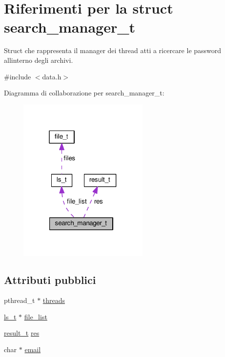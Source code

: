 \hypertarget{structsearch__manager__t}{}\section{Riferimenti per la struct search\+\_\+manager\+\_\+t}
\label{structsearch__manager__t}


Struct che rappresenta il manager dei thread atti a ricercare le password all\textquotesingle{}interno degli archivi.  




{\ttfamily \#include $<$data.\+h$>$}



Diagramma di collaborazione per search\+\_\+manager\+\_\+t\+:\nopagebreak
\begin{figure}[H]
\begin{center}
\leavevmode
\includegraphics[width=183pt]{d6/d51/structsearch__manager__t__coll__graph}
\end{center}
\end{figure}
\subsection*{Attributi pubblici}
\begin{DoxyCompactItemize}
\item 
pthread\+\_\+t $\ast$ \hyperlink{structsearch__manager__t_abac9106caf0478276fc6cf288d30917c}{threads}
\item 
\hyperlink{structls__t}{ls\+\_\+t} $\ast$ \hyperlink{structsearch__manager__t_a7f1f64c246b3827f179dd96c678722cf}{file\+\_\+list}
\item 
\hyperlink{structresult__t}{result\+\_\+t} \hyperlink{structsearch__manager__t_ae71a7eb74a2af2e9f3ea2ab7de643139}{res}
\item 
char $\ast$ \hyperlink{structsearch__manager__t_ad36bf1b5a95e84275ae96e106fc88b6c}{email}
\end{DoxyCompactItemize}


